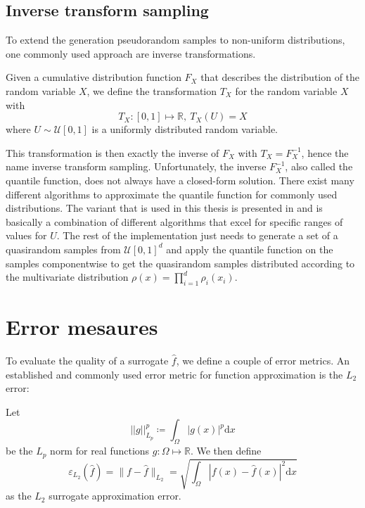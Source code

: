 \documentclass[
  a4paper,  %
  twoside,  %
  bibliography=totoc,
  headsepline,
  cleardoublepage=empty,
  parskip=half,
  draft=false
]{scrbook}
\begin{document}
\subsection{Inverse transform sampling}
To extend the generation pseudorandom samples to non-uniform distributions, one commonly used approach are inverse transformations.
\begin{definition}
Given a cumulative distribution function $F_X$ that describes the distribution of the random variable $X$, we define the transformation $T_X$ for the random variable $X$ with
\begin{equation}
T_X \colon [0,1] \mapsto \mathds{R}, ~ T_X(U)=X
\end{equation}
where $U \sim \mathcal{U}[0,1]$ is a uniformly distributed random variable.
\end{definition}
This transformation is then exactly the inverse of $F_X$ with $T_X=F_X^{-1}$, hence the name inverse transform sampling.
Unfortunately, the inverse $F_X^{-1}$, also called the quantile function, does not always have a closed-form solution.
There exist many different algorithms to approximate the quantile function for commonly used distributions.
The variant that is used in this thesis is presented in \cite{} and is basically a combination of different algorithms that excel for specific ranges of values for $U$.
The rest of the implementation just needs to generate a set of a quasirandom samples from $\mathcal{U}[0,1]^d$ and apply the quantile function on the samples componentwise to get the quasirandom samples distributed according to the multivariate distribution $\rho(x)=\prod_{i=1}^d \rho_i(x_i)$.

\section{Error mesaures}

To evaluate the quality of a surrogate $\hat{f}$, we define a couple of error metrics.
An established and commonly used error metric for function approximation is the $L_2$ error:
\begin{definition}[$L_2$ error]
Let
\begin{equation}
||g||_{L_p}^p \coloneqq \int_{\Omega} |g(x)|^p \text{d}x
\end{equation}
be the $L_p$ norm for real functions $g \colon \Omega \mapsto \mathds{R}$.
We then define
\begin{equation}
\varepsilon_{\text{$L_2$}}(\hat{f})=\|f - \hat{f}\|_{L_2}=\sqrt{\int_{\Omega} |f(x) - \hat{f}(x)|^2 \text{d}x}
\end{equation}
as the $L_2$ surrogate approximation error.
\end{definition}
\end{document}
